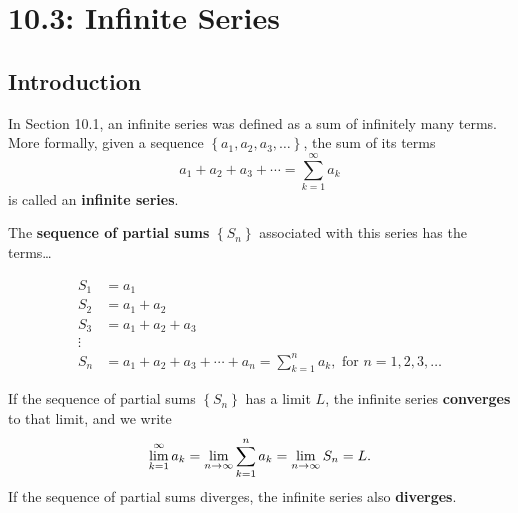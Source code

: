\documentclass[12pt]{article}
\begin{document}
\section*{10.3: Infinite Series}


\vspace{5mm}

\subsection*{Introduction}

In Section 10.1, an infinite series was defined as a sum of infinitely many terms. More formally, given a sequence $\left\{a_1,a_2,a_3,\dots\right\}$, the sum of its terms
$$a_1+a_2+a_3+\cdots=\sum_{k=1}^\infty a_k$$
is called an \textbf{infinite series}.

\vspace{5mm}

The \textbf{sequence of partial sums} $\left\{S_n\right\}$ associated with this series has the terms\dots

\begin{align*}
	S_1 &= a_1\\
	S_2 &= a_1+a_2\\
	S_3 &= a_1+a_2+a_3\\
	\vdots & \\
	S_n &= a_1+a_2+a_3+\cdots + a_n=\sum_{k=1}^n a_k,\text{ for }n=1,2,3,\dots
\end{align*}

If the sequence of partial sums $\left\{S_n\right\}$ has a limit $L$, the infinite series \textbf{converges} to that limit, and we write
$$\displaystyle\lim_{k=1}^\infty a_k=\lim_{n\to\infty}\sum_{k=1}^n a_k=\lim_{n\to\infty}S_n=L.$$
If the sequence of partial sums diverges, the infinite series also \textbf{diverges}.
\end{document}
